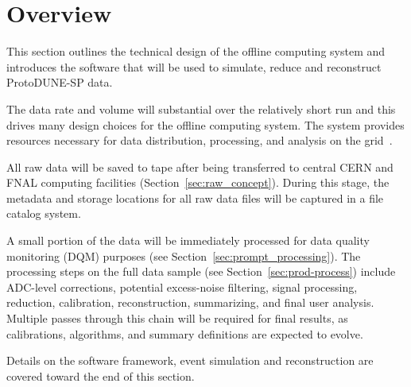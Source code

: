 \section{Overview}

This section outlines the technical design of the offline computing
system and introduces the software that will be used to simulate,
reduce and reconstruct ProtoDUNE-SP data.

The data rate and volume will substantial
  over the relatively short
run and this drives many design choices for the offline computing
system.  The system provides resources necessary for data
distribution, processing, and analysis on the
grid~\cite{data_managm_sys}.

All raw data will be saved to tape after being transferred to central
CERN and FNAL computing facilities (Section~\ref{sec:raw_concept}).
During this stage, the metadata and storage locations for all raw data files
will be captured in a file catalog system.

A small portion of the data will be immediately processed for  
data quality monitoring (DQM) purposes (see Section~\ref{sec:prompt_processing}).
%
The processing steps on the full data sample (see
Section~\ref{sec:prod-process}) include ADC-level corrections,
potential excess-noise filtering, signal processing, reduction,
calibration, reconstruction, summarizing, and final user analysis.
Multiple passes through this chain will be required for final results,
as calibrations, algorithms, and summary definitions are expected to
evolve.  

Details on the software framework, event simulation and
reconstruction are covered toward the end of this section.

